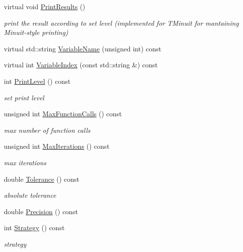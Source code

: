 \begin{DoxyCompactItemize}
\item 
virtual void \mbox{\hyperlink{classROOT_1_1Math_1_1Minimizer_aea1c5d69c6a1c1f2cf4d17a523862560}{Print\+Results}} ()
\begin{DoxyCompactList}\small\item\em print the result according to set level (implemented for T\+Minuit for mantaining Minuit-\/style printing) \end{DoxyCompactList}\item 
virtual std\+::string \mbox{\hyperlink{classROOT_1_1Math_1_1Minimizer_a4d6a3c9c95608b35a25f16afd50690ad}{Variable\+Name}} (unsigned int) const
\item 
virtual int \mbox{\hyperlink{classROOT_1_1Math_1_1Minimizer_a5f7ff3bdda1f4b1d9e5e1150091a86c5}{Variable\+Index}} (const std\+::string \&) const
\item 
int \mbox{\hyperlink{classROOT_1_1Math_1_1Minimizer_ae6c76dc2f3073f19edf22561866c2f9c}{Print\+Level}} () const
\begin{DoxyCompactList}\small\item\em set print level \end{DoxyCompactList}\item 
unsigned int \mbox{\hyperlink{classROOT_1_1Math_1_1Minimizer_a0d7f60c2e5b240258d32feed547b30a3}{Max\+Function\+Calls}} () const
\begin{DoxyCompactList}\small\item\em max number of function calls \end{DoxyCompactList}\item 
unsigned int \mbox{\hyperlink{classROOT_1_1Math_1_1Minimizer_a472e2b4a5d108a378f6905d67c680afc}{Max\+Iterations}} () const
\begin{DoxyCompactList}\small\item\em max iterations \end{DoxyCompactList}\item 
double \mbox{\hyperlink{classROOT_1_1Math_1_1Minimizer_a038755fd3252d054a3bec59f3f008621}{Tolerance}} () const
\begin{DoxyCompactList}\small\item\em absolute tolerance \end{DoxyCompactList}\item 
double \mbox{\hyperlink{classROOT_1_1Math_1_1Minimizer_a10c2c6ff21d1946c61639678435bbf4b}{Precision}} () const
\item 
int \mbox{\hyperlink{classROOT_1_1Math_1_1Minimizer_a7b2a1a1947d6cc627f4753424b77f881}{Strategy}} () const
\begin{DoxyCompactList}\small\item\em strategy \end{DoxyCompactList}\item 

\end{DoxyCompactItemize}
